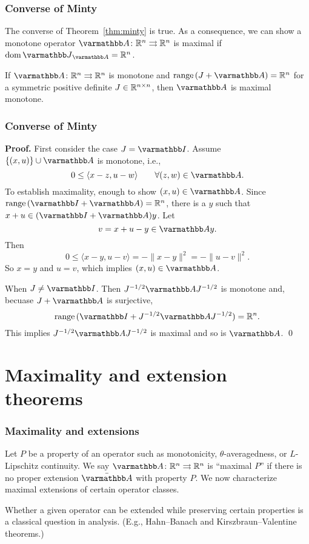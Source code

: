 \documentclass[10pt,mathserif]{beamer}
\begin{document}
\begin{frame}
\frametitle{Converse of Minty}
The converse of Theorem~\ref{thm:minty} is true.
As a consequence, we can show a monotone operator $\opA\colon\reals^n\rightrightarrows \reals^n$ is maximal if $\dom \opJ_\opA=\reals^n$.

\vspace{0.2in}

\begin{theorem}
\label{thm:minty-converse}
If $\opA\colon\reals^n\rightrightarrows \reals^n$ is monotone and $\range(J+\opA)=\reals^n$ for a symmetric positive definite $J\in\mathbb{R}^{n\times n}$, then $\opA$ is maximal monotone.
\end{theorem}
\end{frame}


\begin{frame}[plain]
\frametitle{Converse of Minty}
\textbf{Proof.}
First consider the case $J=\opI$.
Assume $\{(x,u)\}\cup \opA$ is monotone, i.e.,
\[
0\le \langle x-z,u-w\rangle \qquad \forall(z,w)\in \opA.
\]
To establish maximality, enough to show $(x,u)\in \opA$.
Since $\range(\opI+\opA)=\reals^n$, there is a $y$ such that $x+u\in (\opI+\opA)y$.
Let
\[
v=x+u-y\in \opA y.
\]
Then
\[
0\le \langle x-y,u-v\rangle =-\|x-y\|^2=-\|u-v\|^2.
\]
So $x=y$ and $u=v$, which implies $(x,u)\in \opA$.

\vspace{0.2in}

When $J\ne \opI$. Then $J^{-1/2}\opA J^{-1/2}$ is monotone and, becuase $J+\opA$ is surjective,
\[
\range(\opI+J^{-1/2}\opA J^{-1/2})=\reals^n.
\]
This implies $J^{-1/2}\opA J^{-1/2}$ is maximal and so is $\opA$.
\qed
\end{frame}



\section{Maximality and extension theorems}
\begin{frame}
\frametitle{Maximality and extensions}
Let $P$ be a property of an operator such as monotonicity, $\theta$-averagedness, or $L$-Lipschitz continuity.
We say $\opA\colon\reals^n\rightrightarrows \reals^n$ is ``maximal $P$'' if there is no proper extension $\bar{\opA}$ with property $P$.
We now characterize maximal extensions of certain operator classes.

\vspace{0.2in}
Whether a given operator can be extended while preserving certain properties is a classical question in analysis.
(E.g., Hahn--Banach and Kirszbraun--Valentine theorems.)
\end{frame}
\end{document}
